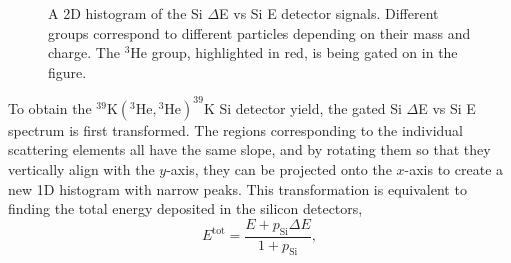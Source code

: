 \begin{figure}[t]
\caption{\label{fig:5deg_SiDEvsSiE}A 2D histogram of the Si $\Delta$E vs Si E detector signals. Different groups correspond to different particles depending on their mass and charge. The $^{3}$He group, highlighted in red, is being gated on in the figure.}
\end{figure}

To obtain the $^{39}\mathrm{K}(^{3}\mathrm{He}, {}^{3}\mathrm{He})^{39}\mathrm{K}$ Si detector yield, the gated Si $\Delta$E vs Si E spectrum is first transformed. The regions corresponding to the individual scattering elements all have the same slope, and by rotating them so that they vertically align with the $y$-axis, they can be projected onto the $x$-axis to create a new 1D histogram with narrow peaks. This transformation is equivalent to finding the total energy deposited in the silicon detectors,
\begin{equation} \label{eqn:Si_Slope}
E^{\mathrm{tot}} = \frac{E + p_{\mathrm{Si}}\Delta E}{1 + p_{\mathrm{Si}}},
\end{equation}

